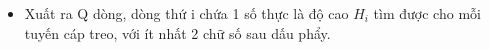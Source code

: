 \begin{itemize}
	\item     Xuất ra Q dòng, dòng thứ i chứa 1 số thực là độ cao    \textbf{     $H_{i}$}    tìm được cho mỗi tuyến cáp treo, với ít nhất 2 chữ số sau dấu phẩy.   
\end{itemize}